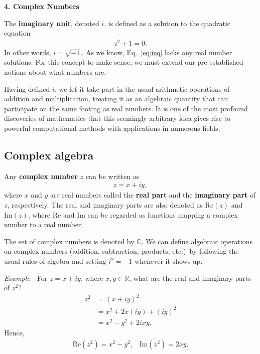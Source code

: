 \documentclass[10pt,a4paper]{article}
\begin{document}
\setcounter{page}{21}

\noindent
{\Large \textbf{4. Complex Numbers}}
\vskip 0.2in
\label{complex-numbers}

The \textbf{imaginary unit}, denoted $i$, is defined as a solution to
the quadratic equation
\begin{align}
  z^2 + 1 = 0.
  \label{eq:ieq}
\end{align}
In other words, $i = \sqrt{-1}$. As we know, Eq.~\eqref{eq:ieq} lacks
any real number solutions. For this concept to make sense, we must
extend our pre-established notions about what numbers are.

Having defined $i$, we let it take part in the usual arithmetic
operations of addition and multiplication, treating it as an algebraic
quantity that can participate on the same footing as real numbers. It
is one of the most profound discoveries of mathematics that this
seemingly arbitrary idea gives rise to powerful computational methods
with applications in numerous fields.

\subsection{Complex algebra}
\label{complex-algebra}

Any \textbf{complex number} $z$ can be written as
\begin{align}
  z = x + i y,
\end{align}
where $x$ and $y$ are real numbers called the \textbf{real part} and
the \textbf{imaginary part} of $z$, respectively.  The real and
imaginary parts are also denoted as $\mathrm{Re}(z)$ and
$\mathrm{Im}(z)$, where $\mathrm{Re}$ and $\mathrm{Im}$ can be
regarded as functions mapping a complex number to a real number.

The set of complex numbers is denoted by $\mathbb{C}$.  We can define
algebraic operations on complex numbers (addition, subtraction,
products, etc.)~by following the usual rules of algebra and setting
$i^2 = -1$ whenever it shows up.

\begin{framed}\noindent
  \textit{Example}---For $z = x + i y$, where $x, y \in \mathbb{R}$,
  what are the real and imaginary parts of $z^2$?
  \begin{align}
    z^2 &= (x+iy)^2 \\&= x^2 + 2x(iy) + (iy)^2 \\&= x^2 - y^2 + 2ixy.
  \end{align}
  Hence,
  \begin{align}
    \mathrm{Re}(z^2) = x^2 -y^2, \;\;\; \mathrm{Im}(z^2) = 2xy.
  \end{align}
\end{framed}
\end{document}
